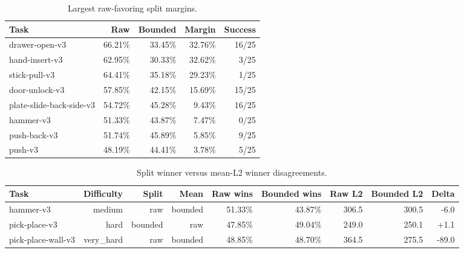 \begin{table}[ht]
\centering
\caption{Largest raw-favoring split margins.}
\label{tab:phase57-max150-raw-margins}
\begin{tabular}{@{}lrrrr@{}}
\toprule
Task & Raw & Bounded & Margin & Success \\
\midrule
drawer-open-v3 & 66.21\% & 33.45\% & 32.76\% & 16/25 \\
hand-insert-v3 & 62.95\% & 30.33\% & 32.62\% & 3/25 \\
stick-pull-v3 & 64.41\% & 35.18\% & 29.23\% & 1/25 \\
door-unlock-v3 & 57.85\% & 42.15\% & 15.69\% & 15/25 \\
plate-slide-back-side-v3 & 54.72\% & 45.28\% & 9.43\% & 16/25 \\
hammer-v3 & 51.33\% & 43.87\% & 7.47\% & 0/25 \\
push-back-v3 & 51.74\% & 45.89\% & 5.85\% & 9/25 \\
push-v3 & 48.19\% & 44.41\% & 3.78\% & 5/25 \\
\bottomrule
\end{tabular}
\end{table}


\begin{table}[ht]
\centering
\caption{Split winner versus mean-L2 winner disagreements.}
\label{tab:phase57-max150-disagreements}
\begin{tabular}{@{}lrrrrrrrr@{}}
\toprule
Task & Difficulty & Split & Mean & Raw wins & Bounded wins & Raw L2 & Bounded L2 & Delta \\
\midrule
hammer-v3 & medium & raw & bounded & 51.33\% & 43.87\% & 306.5 & 300.5 & -6.0 \\
pick-place-v3 & hard & bounded & raw & 47.85\% & 49.04\% & 249.0 & 250.1 & +1.1 \\
pick-place-wall-v3 & very\_hard & raw & bounded & 48.85\% & 48.70\% & 364.5 & 275.5 & -89.0 \\
\bottomrule
\end{tabular}
\end{table}



